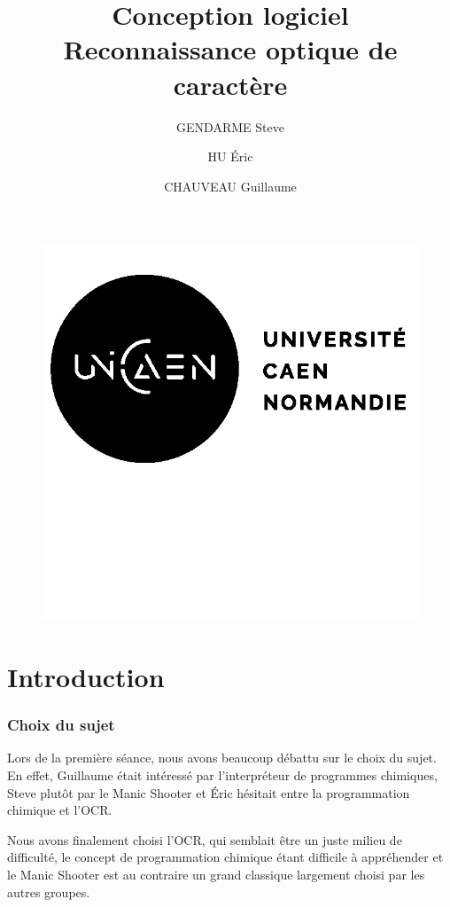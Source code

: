\documentclass[a4paper, 12pt]{article}
\begin{document}
\title{Conception logiciel \\ Reconnaissance optique de caractère}
\author{GENDARME Steve \and HU Éric \and CHAUVEAU Guillaume}
\maketitle
\begin{figure}[!b]
\includegraphics{img/logo.png}
\end{figure}

\pagebreak

\tableofcontents

\pagebreak
\part{Introduction}
\section{Choix du sujet}
Lors de la première séance, nous avons beaucoup débattu sur le choix du sujet. En effet, Guillaume était intéressé par l'interpréteur de programmes chimiques, Steve plutôt par le Manic Shooter et Éric hésitait entre la programmation chimique et l'OCR.

Nous avons finalement choisi l'OCR, qui semblait être un juste milieu de difficulté, le concept de programmation chimique étant difficile à appréhender et le Manic Shooter est au contraire un grand classique largement choisi par les autres groupes.
\end{document}
